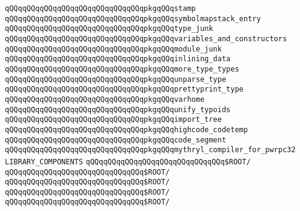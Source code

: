 \verb|qQQqqQQqqQQqqQQqqQQqqQQqqQQqqQQqpkgqQQqstamp|\newline
\verb|qQQqqQQqqQQqqQQqqQQqqQQqqQQqqQQqpkgqQQqsymbolmapstack_entry|\newline
\verb|qQQqqQQqqQQqqQQqqQQqqQQqqQQqqQQqpkgqQQqtype_junk|\newline
\verb|qQQqqQQqqQQqqQQqqQQqqQQqqQQqqQQqpkgqQQqvariables_and_constructors|\newline
\verb|qQQqqQQqqQQqqQQqqQQqqQQqqQQqqQQqpkgqQQqmodule_junk|\newline
\verb|qQQqqQQqqQQqqQQqqQQqqQQqqQQqqQQqpkgqQQqinlining_data|\newline
\verb|qQQqqQQqqQQqqQQqqQQqqQQqqQQqqQQqpkgqQQqmore_type_types|\newline
\verb|qQQqqQQqqQQqqQQqqQQqqQQqqQQqqQQqpkgqQQqunparse_type|\newline
\verb|qQQqqQQqqQQqqQQqqQQqqQQqqQQqqQQqpkgqQQqprettyprint_type|\newline
\verb|qQQqqQQqqQQqqQQqqQQqqQQqqQQqqQQqpkgqQQqvarhome|\newline
\verb|qQQqqQQqqQQqqQQqqQQqqQQqqQQqqQQqpkgqQQqunify_typoids|\newline
\verb|qQQqqQQqqQQqqQQqqQQqqQQqqQQqqQQqpkgqQQqimport_tree|\newline
\verb|qQQqqQQqqQQqqQQqqQQqqQQqqQQqqQQqpkgqQQqhighcode_codetemp|\newline
\verb|qQQqqQQqqQQqqQQqqQQqqQQqqQQqqQQqpkgqQQqcode_segment|\newline
\newline
\verb|qQQqqQQqqQQqqQQqqQQqqQQqqQQqqQQqpkgqQQqmythryl_compiler_for_pwrpc32|\newline
\newline
\verb|LIBRARY_COMPONENTS|\newline
\verb|qQQqqQQqqQQqqQQqqQQqqQQqqQQqqQQq$ROOT/|\newline
\verb|qQQqqQQqqQQqqQQqqQQqqQQqqQQqqQQq$ROOT/|\newline
\verb|qQQqqQQqqQQqqQQqqQQqqQQqqQQqqQQq$ROOT/|\newline
\verb|qQQqqQQqqQQqqQQqqQQqqQQqqQQqqQQq$ROOT/|\newline
\verb|qQQqqQQqqQQqqQQqqQQqqQQqqQQqqQQq$ROOT/|\newline
